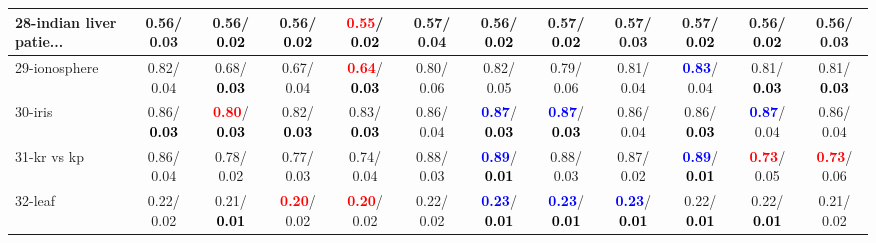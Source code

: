 \begin{table}[h]
\begin{center}
{\begin{tabular}{lc|c|c|c|c|c|c|c|c|c|c}
28-indian liver patie... &   0.56/  0.03 &   0.56/\textcolor{black}{\textbf{  0.02}} &   0.56/\textcolor{black}{\textbf{  0.02}} & \textcolor{red}{\textbf{  0.55}}/\textcolor{black}{\textbf{  0.02}} &   0.57/  0.04 &   0.56/\textcolor{black}{\textbf{  0.02}} &   0.57/\textcolor{black}{\textbf{  0.02}} &   0.57/  0.03 &   0.57/\textcolor{black}{\textbf{  0.02}} &   0.56/\textcolor{black}{\textbf{  0.02}} &   0.56/  0.03 \\ \hline
29-ionosphere &   0.82/  0.04 &   0.68/\textcolor{black}{\textbf{  0.03}} &   0.67/  0.04 & \textcolor{red}{\textbf{  0.64}}/\textcolor{black}{\textbf{  0.03}} &   0.80/  0.06 &   0.82/  0.05 &   0.79/  0.06 &   0.81/  0.04 & \textcolor{blue}{\textbf{  0.83}}/  0.04 &   0.81/\textcolor{black}{\textbf{  0.03}} &   0.81/\textcolor{black}{\textbf{  0.03}} \\
30-iris &   0.86/\textcolor{black}{\textbf{  0.03}} & \textcolor{red}{\textbf{  0.80}}/\textcolor{black}{\textbf{  0.03}} &   0.82/\textcolor{black}{\textbf{  0.03}} &   0.83/\textcolor{black}{\textbf{  0.03}} &   0.86/  0.04 & \textcolor{blue}{\textbf{  0.87}}/\textcolor{black}{\textbf{  0.03}} & \textcolor{blue}{\textbf{  0.87}}/\textcolor{black}{\textbf{  0.03}} &   0.86/  0.04 &   0.86/\textcolor{black}{\textbf{  0.03}} & \textcolor{blue}{\textbf{  0.87}}/  0.04 &   0.86/  0.04 \\
31-kr vs kp &   0.86/  0.04 &   0.78/  0.02 &   0.77/  0.03 &   0.74/  0.04 &   0.88/  0.03 & \textcolor{blue}{\textbf{  0.89}}/\textcolor{black}{\textbf{  0.01}} &   0.88/  0.03 &   0.87/  0.02 & \textcolor{blue}{\textbf{  0.89}}/\textcolor{black}{\textbf{  0.01}} & \textcolor{red}{\textbf{  0.73}}/  0.05 & \textcolor{red}{\textbf{  0.73}}/  0.06 \\
32-leaf &   0.22/  0.02 &   0.21/\textcolor{black}{\textbf{  0.01}} & \textcolor{red}{\textbf{  0.20}}/  0.02 & \textcolor{red}{\textbf{  0.20}}/  0.02 &   0.22/  0.02 & \textcolor{blue}{\textbf{  0.23}}/\textcolor{black}{\textbf{  0.01}} & \textcolor{blue}{\textbf{  0.23}}/\textcolor{black}{\textbf{  0.01}} & \textcolor{blue}{\textbf{  0.23}}/\textcolor{black}{\textbf{  0.01}} &   0.22/\textcolor{black}{\textbf{  0.01}} &   0.22/\textcolor{black}{\textbf{  0.01}} &   0.21/  0.02 \\\end{tabular}
}\label{strats0bC4.5w}
\end{center}
\end{table}
